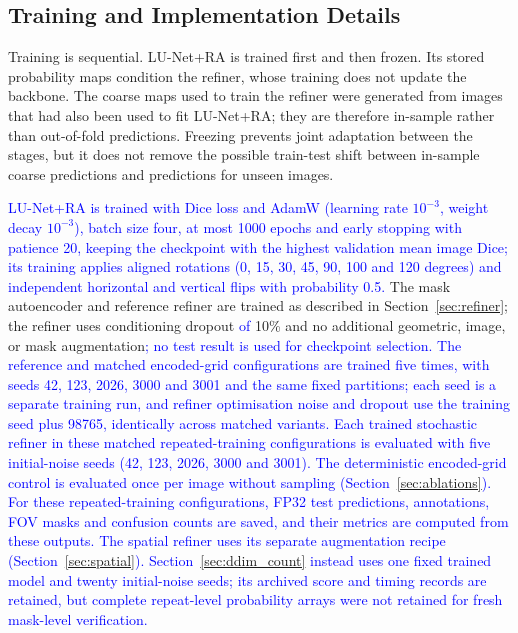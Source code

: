 \documentclass[jimaging,article,submit,pdftex,moreauthors]
  {Definitions/mdpi}
\DeclareRobustCommand{\rev}[1]{\textcolor{blue}{#1}}
\DeclareRobustCommand{\rev}[1]{#1}
\providecommand{\linelabel}[1]{}
\newcommand{\seclabel}[1]{\linelabel{rev:sec:#1}}
\begin{document}
\subsection{Training and Implementation Details}
\label{sec:training}
\seclabel{training}

Training is sequential. LU-Net+RA is trained first and then frozen. Its stored probability maps condition the refiner, whose training does not update the backbone. The coarse maps used to train the refiner were generated from images that had also been used to fit LU-Net+RA; they are therefore in-sample rather than out-of-fold predictions. Freezing prevents joint adaptation between the stages, but it does not remove the possible train-test shift between in-sample coarse predictions and predictions for unseen images.

\rev{LU-Net+RA is trained with Dice loss and AdamW (learning rate $10^{-3}$, weight decay $10^{-3}$), batch size four, at most 1000 epochs and early stopping with patience 20, keeping the checkpoint with the highest validation mean image Dice; its training applies aligned rotations (0, 15, 30, 45, 90, 100 and 120 degrees) and independent horizontal and vertical flips with probability 0.5.} The mask autoencoder and reference refiner are trained as described in Section~\ref{sec:refiner}; the refiner uses conditioning dropout \rev{of} 10\% and no additional geometric, image, or mask augmentation\rev{; no test result is used for checkpoint selection. The reference and matched encoded-grid configurations are trained five times, with seeds 42, 123, 2026, 3000 and 3001 and the same fixed partitions; each seed is a separate training run, and refiner optimisation noise and dropout use the training seed plus 98765, identically across matched variants. Each trained stochastic refiner in these matched repeated-training configurations is evaluated with five initial-noise seeds (42, 123, 2026, 3000 and 3001). The deterministic encoded-grid control is evaluated once per image without sampling (Section~\ref{sec:ablations}). For these repeated-training configurations, FP32 test predictions, annotations, FOV masks and confusion counts are saved, and their metrics are computed from these outputs. The spatial refiner uses its separate augmentation recipe (Section~\ref{sec:spatial}). Section~\ref{sec:ddim_count} instead uses one fixed trained model and twenty initial-noise seeds; its archived score and timing records are retained, but complete repeat-level probability arrays were not retained for fresh mask-level verification.}
\end{document}
